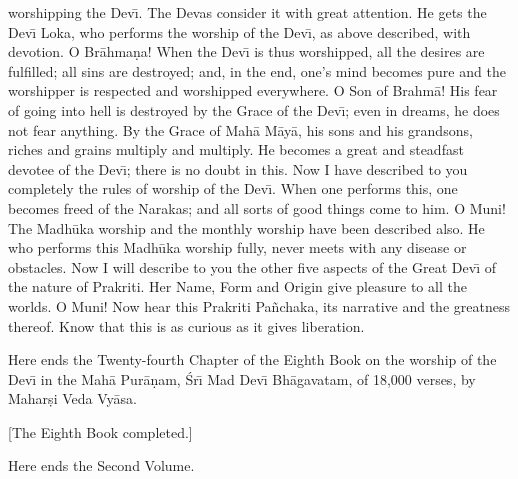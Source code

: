 worshipping the Dev\={\i}. The Devas consider it with great attention. He gets the Dev\={\i} Loka, who performs the worship of the Dev\={\i}, as above described, with devotion. O Br\=ahma\d{n}a! When the Dev\={\i} is thus worshipped, all the desires are fulfilled; all sins are destroyed; and, in the end, one's mind becomes pure and the worshipper is respected and worshipped everywhere. O Son of Brahm\=a! His fear of going into hell is destroyed by the Grace of the Dev\={\i}; even in dreams, he does not fear anything. By the Grace of Mah\=a M\=ay\=a, his sons and his grandsons, riches and grains multiply and multiply. He becomes a great and steadfast devotee of the Dev\={\i}; there is no doubt in this. Now I have described to you completely the rules of worship of the Dev\={\i}. When one performs this, one becomes freed of the Narakas; and all sorts of good things come to him. O Muni! The Madh\=uka worship and the monthly worship have been described also. He who performs this Madh\=uka worship fully, never meets with any disease or obstacles. Now I will describe to you the other five aspects of the Great Dev\={\i} of the nature of Prakriti. Her Name, Form and Origin give pleasure to all the worlds. O Muni! Now hear this Prakriti Pa\~nchaka, its narrative and the greatness thereof. Know that this is as curious as it gives liberation.

Here ends the Twenty-fourth Chapter of the Eighth Book on the worship of the Dev\={\i} in the Mah\=a Pur\=a\d{n}am, \'Sr\={\i} Mad Dev\={\i} Bh\=agavatam, of 18,000 verses, by Mahar\d{s}i Veda Vy\=asa.

[The Eighth Book completed.]

Here ends the Second Volume.



